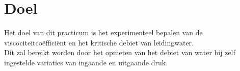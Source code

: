 \section{Doel}

Het doel van dit practicum is het experimenteel bepalen van de viscociteitco\"effici\"ent 
en het kritische debiet van leidingwater. \\

Dit zal bereikt worden door het opmeten van het debiet van 
water bij zelf ingestelde variaties van ingaande en uitgaande 
druk. 
